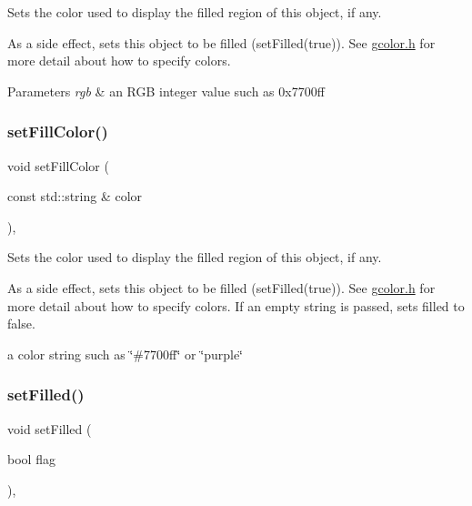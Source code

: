 Sets the color used to display the filled region of this object, if any. 

As a side effect, sets this object to be filled (set\+Filled(true)). See \mbox{\hyperlink{gcolor_8h_source}{gcolor.\+h}} for more detail about how to specify colors.


\begin{DoxyParams}{Parameters}
{\em rgb} & an R\+GB integer value such as 0x7700ff \\
\hline
\end{DoxyParams}
\mbox{\label{classGObject_adbc18b1a930aadd97d7437f9f7265b96}} 
\subsubsection{\texorpdfstring{set\+Fill\+Color()}{setFillColor()}\hspace{0.1cm}{\footnotesize\ttfamily [3/3]}}
{\footnotesize\ttfamily void set\+Fill\+Color (\begin{DoxyParamCaption}\item[{const std\+::string \&}]{color }\end{DoxyParamCaption})\hspace{0.3cm}{\ttfamily [virtual]}, {\ttfamily [inherited]}}



Sets the color used to display the filled region of this object, if any. 

As a side effect, sets this object to be filled (set\+Filled(true)). See \mbox{\hyperlink{gcolor_8h_source}{gcolor.\+h}} for more detail about how to specify colors. If an empty string is passed, sets filled to false.

a color string such as \char`\"{}\#7700ff\char`\"{} or \char`\"{}purple\char`\"{} \mbox{\label{classGObject_a9b82b53362282c6bb7d6947068d2e55b}} 
\subsubsection{\texorpdfstring{set\+Filled()}{setFilled()}}
{\footnotesize\ttfamily void set\+Filled (\begin{DoxyParamCaption}\item[{bool}]{flag }\end{DoxyParamCaption})\hspace{0.3cm}{\ttfamily [virtual]}, {\ttfamily [inherited]}}



